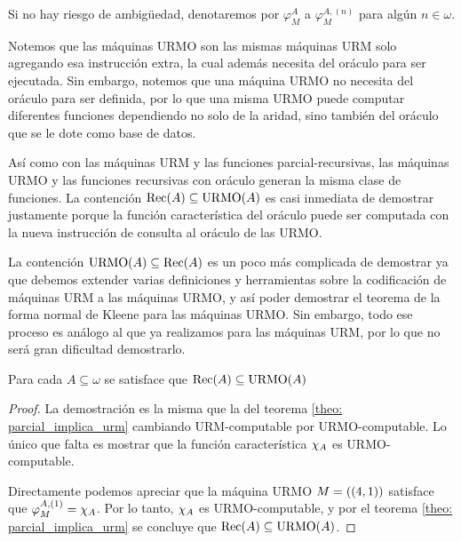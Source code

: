 \begin{agregado}
\begin{notation}
	Si no hay riesgo de ambigüedad, denotaremos por $\varphi_{M}^{A}$ a $\varphi_{M}^{A, (n)}$ para algún $n\in\omega$.
\end{notation}

Notemos que las máquinas URMO son las mismas máquinas URM solo agregando esa instrucción extra, la cual además necesita del oráculo  para ser ejecutada. Sin embargo, notemos que una máquina URMO no necesita del oráculo para ser definida, por lo que una misma URMO puede computar diferentes funciones dependiendo no solo de la aridad, sino también del oráculo que se le dote como base de datos.

Así como con las máquinas URM y las funciones parcial-recursivas, las máquinas URMO y las funciones recursivas con oráculo generan la misma clase de funciones. La contención $\RECURSIVO\pa*{A}\subseteq\URMO\pa*{A}$ es casi inmediata de demostrar justamente porque la función característica del oráculo puede ser computada con la nueva instrucción de consulta al oráculo de las URMO.

La contención $\URMO\pa*{A}\subseteq\RECURSIVO\pa*{A}$ es un poco más complicada de demostrar ya que debemos extender varias definiciones y herramientas sobre la codificación de máquinas URM a las máquinas URMO, y así poder demostrar el teorema de la forma normal de Kleene para las máquinas URMO. Sin embargo, todo ese proceso es análogo al que ya realizamos para las máquinas URM, por lo que no será gran dificultad demostrarlo.

\begin{theorem}
	\label{theo: rec_contenido_urmo}
	Para cada $A\subseteq\omega$ se satisface que $\RECURSIVO\pa*{A}\subseteq\URMO\pa*{A}$
\end{theorem}

\begin{proof}
	La demostración es la misma que la del teorema \ref{theo: parcial_implica_urm} cambiando URM-computable por URMO-computable. Lo único que falta es mostrar que la función característica $\CARACTERISTICA{A}$ es URMO-computable.

	Directamente podemos apreciar que la máquina URMO $M =\pa*{\pa*{4, 1}}$ satisface que $\varphi_{M}^{A, (1)} =\CARACTERISTICA{A}$. Por lo tanto, $\CARACTERISTICA{A}$ es URMO-computable, y por el teorema \ref{theo: parcial_implica_urm} se concluye que $\RECURSIVO\pa*{A}\subseteq\URMO\pa*{A}$.
\end{proof}


\end{agregado}
